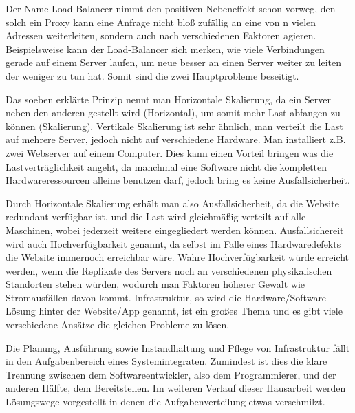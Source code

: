 Der Name Load-Balancer nimmt den positiven Nebeneffekt schon vorweg, den solch ein Proxy kann eine Anfrage nicht bloß zufällig an eine von n vielen Adressen weiterleiten, sondern auch nach verschiedenen Faktoren agieren.
Beispielsweise kann der Load-Balancer sich merken, wie viele Verbindungen gerade auf einem Server laufen, um neue besser an einen Server weiter zu leiten der weniger zu tun hat. Somit sind die zwei Hauptprobleme beseitigt.

Das soeben erklärte Prinzip nennt man Horizontale Skalierung, da ein Server neben den anderen gestellt wird (Horizontal), um somit mehr Last abfangen zu können (Skalierung).
Vertikale Skalierung ist sehr ähnlich, man verteilt die Last auf mehrere Server, jedoch nicht auf verschiedene Hardware. Man installiert z.B. zwei Webserver auf einem Computer. 
Dies kann einen Vorteil bringen was die Lastverträglichkeit angeht, da manchmal eine Software nicht die kompletten Hardwareressourcen alleine benutzen darf, jedoch bring es keine Ausfallsicherheit.

Durch Horizontale Skalierung erhält man also Ausfallsicherheit, da die Website redundant verfügbar ist, und die Last wird gleichmäßig verteilt auf alle Maschinen, wobei jederzeit weitere eingegliedert werden können.
Ausfallsichereit wird auch Hochverfügbarkeit genannt, da selbst im Falle eines Hardwaredefekts die Website immernoch erreichbar wäre. Wahre Hochverfügbarkeit würde erreicht werden, wenn die Replikate des Servers noch
an verschiedenen physikalischen Standorten stehen würden, wodurch man Faktoren höherer Gewalt wie Stromausfällen davon kommt. Infrastruktur, so wird die Hardware/Software Lösung hinter der Website/App genannt, ist ein großes
Thema und es gibt viele verschiedene Ansätze die gleichen Probleme zu lösen.

Die Planung, Ausführung sowie Instandhaltung und Pflege von Infrastruktur fällt in den Aufgabenbereich eines Systemintegraten. Zumindest ist dies die klare Trennung zwischen 
dem Softwareentwickler, also dem Programmierer, und der anderen Hälfte, dem Bereitstellen. Im weiteren Verlauf dieser Hausarbeit werden Lösungswege vorgestellt in denen die Aufgabenverteilung etwas verschmilzt.
